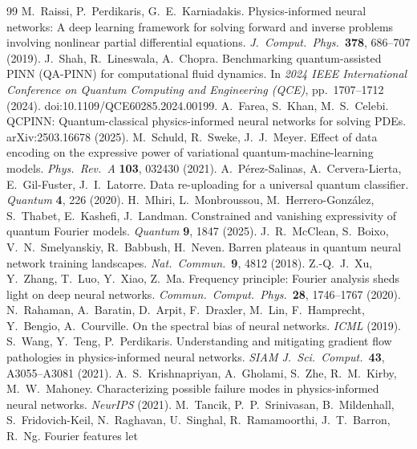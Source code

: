 \documentclass[11pt]{article}
\begin{document}
\begin{thebibliography}{99}
\small
{} M.~Raissi, P.~Perdikaris, G.~E.~Karniadakis. Physics-informed neural
  networks: A deep learning framework for solving forward and inverse problems involving
  nonlinear partial differential equations. \emph{J.\ Comput.\ Phys.}\ \textbf{378},
  686--707 (2019).
 J.~Shah, R.~Lineswala, A.~Chopra. Benchmarking quantum-assisted PINN
  (QA-PINN) for computational fluid dynamics. In \emph{2024 IEEE International Conference
  on Quantum Computing and Engineering (QCE)}, pp.~1707--1712 (2024).
  doi:10.1109/QCE60285.2024.00199.
 A.~Farea, S.~Khan, M.~S.~Celebi. QCPINN: Quantum-classical
  physics-informed neural networks for solving PDEs. arXiv:2503.16678 (2025).
 M.~Schuld, R.~Sweke, J.~J.~Meyer. Effect of data encoding on the
  expressive power of variational quantum-machine-learning models. \emph{Phys.\ Rev.\ A}
  \textbf{103}, 032430 (2021).
 A.~P\'erez-Salinas, A.~Cervera-Lierta, E.~Gil-Fuster, J.~I.~Latorre.
  Data re-uploading for a universal quantum classifier. \emph{Quantum} \textbf{4}, 226
  (2020).
 H.~Mhiri, L.~Monbroussou, M.~Herrero-Gonz\'alez, S.~Thabet, E.~Kashefi,
  J.~Landman. Constrained and vanishing expressivity of quantum Fourier models.
  \emph{Quantum} \textbf{9}, 1847 (2025).
 J.~R.~McClean, S.~Boixo, V.~N.~Smelyanskiy, R.~Babbush, H.~Neven.
  Barren plateaus in quantum neural network training landscapes. \emph{Nat.\ Commun.}\
  \textbf{9}, 4812 (2018).
 Z.-Q.~J.~Xu, Y.~Zhang, T.~Luo, Y.~Xiao, Z.~Ma. Frequency principle:
  Fourier analysis sheds light on deep neural networks. \emph{Commun.\ Comput.\ Phys.}\
  \textbf{28}, 1746--1767 (2020).
\bibitem{rahaman} N.~Rahaman, A.~Baratin, D.~Arpit, F.~Draxler, M.~Lin, F.~Hamprecht,
  Y.~Bengio, A.~Courville. On the spectral bias of neural networks. \emph{ICML} (2019).
\bibitem{wang} S.~Wang, Y.~Teng, P.~Perdikaris. Understanding and mitigating gradient
  flow pathologies in physics-informed neural networks. \emph{SIAM J.\ Sci.\ Comput.}\
  \textbf{43}, A3055--A3081 (2021).
\bibitem{krishnapriyan} A.~S.~Krishnapriyan, A.~Gholami, S.~Zhe, R.~M.~Kirby,
  M.~W.~Mahoney. Characterizing possible failure modes in physics-informed neural
  networks. \emph{NeurIPS} (2021).
\bibitem{tancik} M.~Tancik, P.~P.~Srinivasan, B.~Mildenhall, S.~Fridovich-Keil,
  N.~Raghavan, U.~Singhal, R.~Ramamoorthi, J.~T.~Barron, R.~Ng. Fourier features let

\end{thebibliography}
\end{document}
